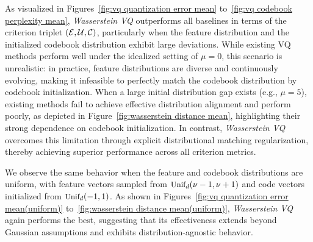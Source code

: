 As visualized in Figures~\ref{fig:vq quantization error mean} to~\ref{fig:vq codebook perplexity mean}, \emph{Wasserstein VQ} outperforms all baselines in terms of the criterion triplet $(\mathcal{E}, \mathcal{U}, \mathcal{C})$, particularly when the feature distribution and the initialized codebook distribution exhibit large deviations. While existing VQ methods perform well under the idealized setting of $\mu=0$, this scenario is unrealistic: in practice, feature distributions are diverse and continuously evolving, making it infeasible to perfectly match the codebook distribution by codebook initialization. When a large initial distribution gap exists (e.g., $\mu=5$), existing methods fail to achieve effective distribution alignment and perform poorly, as depicted in Figure~\ref{fig:wasserstein distance mean}, highlighting their strong dependence on codebook initialization. In contrast, \emph{Wasserstein VQ} overcomes this limitation through explicit distributional matching regularization, thereby achieving superior performance across all criterion metrics.




We observe the same behavior when the feature and codebook distributions are uniform, with feature vectors sampled from ${\textnormal{\small Unif}}_d(\nu-1, \nu+1)$ and code vectors initialized from ${\textnormal{\small Unif}}_d(-1,1)$. As shown in Figures~\ref{fig:vq quantization error mean(uniform)} to~\ref{fig:wasserstein distance mean(uniform)}, \emph{Wasserstein VQ} again performs the best, suggesting that its effectiveness extends beyond Gaussian assumptions and exhibits distribution-agnostic behavior.